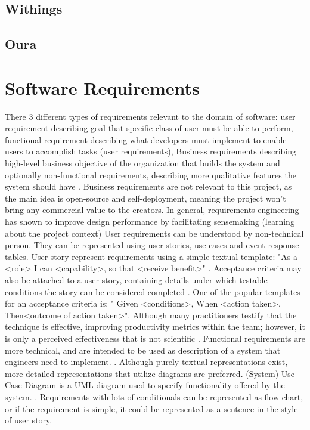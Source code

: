 \subsection{Withings}
\label{section:WithingsWatch}
\subsection{Oura}
\label{section:OuraRing}
\section{Software Requirements}
There 3 different types of requirements relevant to the domain of software: user requirement describing goal that specific class of user must be able to perform, functional requirement describing what developers must implement to enable users to accomplish tasks (user requirements), Business requirements describing high-level business objective of the organization that builds the system and optionally non-functional requirements, describing more qualitative features the system should have \cite{wiegers2013software}. Business requirements are not relevant to this project, as the main idea is open-source and self-deployment, meaning the project won't bring any commercial value to the creators. 
In general, requirements engineering has shown to improve design performance by facilitating sensemaking (learning about the project context)
User requirements can be understood by non-technical person. They can be represented using user stories, use cases and event-response tables. User story represent requirements using a simple textual template: "As a <role> I can <capability>, so that <receive benefit>" \cite{userStories}. Acceptance criteria may also be attached to a user story, containing details under which testable conditions the story can be considered completed \cite{Kannan2019User}. One of the popular templates for an acceptance criteria is: " Given <conditions>, When <action taken>, Then<outcome of action taken>". Although many practitioners testify that the technique is effective, improving productivity metrics within the team; however, it is only a perceived effectiveness that is not scientific \cite{userStories}.
Functional requirements are more technical, and are intended to be used as description of a system that engineers need to implement. \cite{wiegers2013software}. Although purely textual representations exist, more detailed representations that utilize diagrams are preferred. (System) Use Case Diagram is a UML diagram used to specify functionality offered by the system. \cite{malan2001functional}. Requirements with lots of conditionals can be represented as flow chart, or if the requirement is simple, it could be represented as a sentence in the style of user story. 

